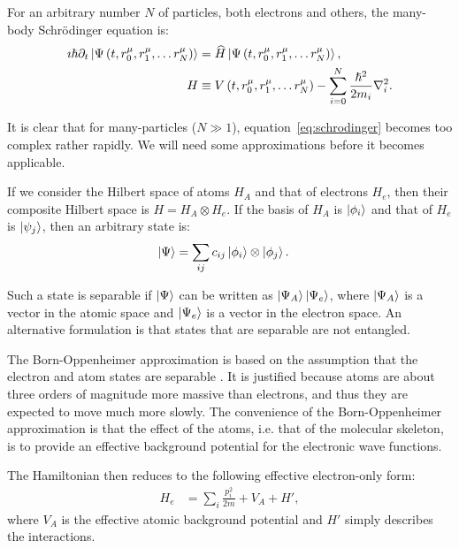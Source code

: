For an arbitrary number $N$ of particles, both electrons and others, the many-body Schr\"o\-dinger equation is:
\begin{align}
 \imath \hslash \partial_t\ket{\Psi\left(t, r_0^\mu, r_1^\mu, \ldots r_N^\mu\right)} &= \widehat{H} \ket{\Psi\left(t, r_0^\mu, r_1^\mu, \ldots r_N^\mu\right)} \label{eq:schrodinger}, \\
 H &\equiv V\left(t, r_0^\mu, r_1^\mu, \ldots r_N^\mu\right) - \sum_{i=0}^N \frac{\hslash^2}{2m_i} \nabla_i^2.
\end{align}

It is clear that for many-particles ($N\gg 1$), equation~\ref{eq:schrodinger} becomes too complex rather rapidly. We will need some approximations before it becomes applicable.

If we consider the Hilbert space of atoms $H_A$ and that of electrons $H_e$, then their composite Hilbert space is $H = H_A \otimes H_e$. If the basis of $H_A$ is $\ket{\phi_i}$ and that of $H_e$ is $\ket{\psi_j}$, then an arbitrary state is:
\begin{align}
\ket{\Psi} &= \sum_{ij} c_{ij} \ket{\phi_i} \otimes \ket{\phi_j}.
\end{align}

Such a state is separable if  $\ket{\Psi}$ can be written as $\ket{\Psi_A} \ket{\Psi_e}$, where $\ket{\Psi_A}$ is a vector in the atomic space and $\ket{\Psi_e}$ is a vector in the electron space. An alternative formulation is that states that are separable are not entangled.

The Born-Oppenheimer approximation is based on the assumption that the electron and atom  states are separable \cite{mattuck}. It is justified because atoms are about three orders of magnitude more massive than electrons, and thus they are expected to move much more slowly. The convenience of the Born-Oppenheimer approximation is that the effect of the atoms, i.e. that of the molecular skeleton, is to provide an effective background potential for the electronic wave functions.

The Hamiltonian then reduces to the following effective electron-only form:
\begin{align}
H_e &= \sum_i \frac{p_i^2}{2m} + V_A + H',
\end{align}
where $V_A$ is the effective atomic background potential and $H'$ simply describes the interactions.

